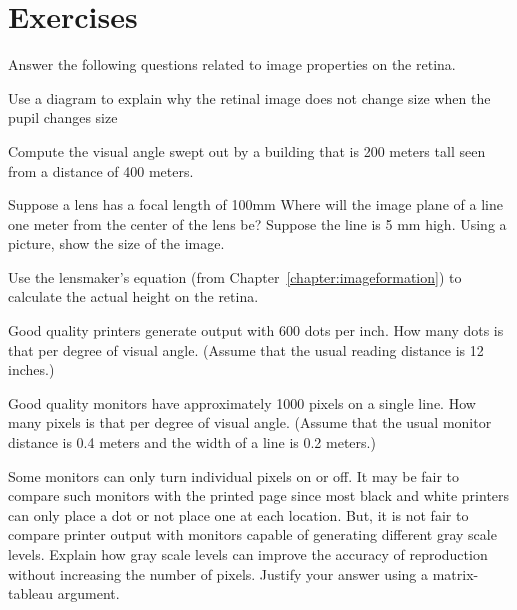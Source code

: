 
\newpage
\section*{Exercises}

\be  %

\item Answer the following 
questions related to image properties on the retina.

 \be
 \item  Use a diagram to explain why the retinal image does not change
size when the pupil changes size

 \item Compute the visual angle swept out by a building that is
200 meters tall seen from a distance of 400 meters.

 \item  Suppose a lens has a focal length of 100mm
Where will the image plane of a line one meter from the
center of the lens be?
Suppose the line is 5 mm high.
Using a picture, show the size of the image.

 \item Use the lensmaker's equation
(from Chapter~\ref{chapter:imageformation}) to calculate
the actual height on the retina.

 \item Good quality printers generate output with 600 dots per inch.
How many dots is that per degree of visual angle.
(Assume that the usual reading distance is 12 inches.)

 \item Good quality monitors have approximately 1000 pixels on
a single line.  How many pixels is that per degree of visual angle.
(Assume that the usual monitor distance is 0.4 meters and the
width of a line is 0.2 meters.)
  \item Some monitors can only turn individual pixels on or off.
It may be fair to compare such monitors with the printed page
since most black and white printers can only place a dot or not
place one at each location.
But, it is not fair to compare printer output
with monitors capable of generating different gray scale levels.
Explain how gray scale levels can improve the accuracy of
reproduction without increasing the number of pixels.
Justify your answer using a matrix-tableau argument.
 \ee

